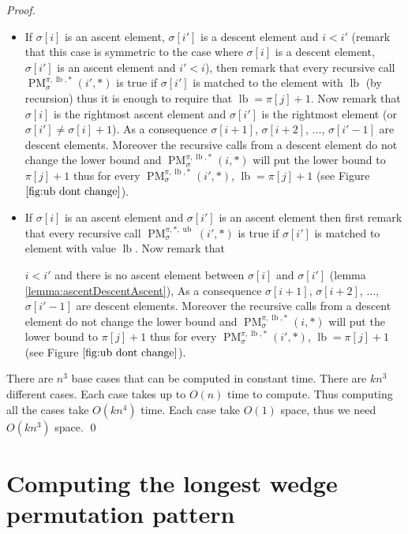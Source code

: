\documentclass[a4paper]{llncs}
\newcommand{\ptext}{\pi}
\newcommand{\ppattern}{\sigma}
\DeclareMathOperator{\PMa}{PM}
\newcommand{\PM}[6]{\PMa_{{#1}}^{{#2},{#3},{#4}}({#5},{#6})}
\DeclareMathOperator{\lb}{lb}
\DeclareMathOperator{\ub}{ub}
\begin{document}
\begin{proof}
\begin{itemize}
\begin{itemize}
			\item If $\ppattern[i]$ is an ascent element, $\ppattern[i']$ is a descent element and $i<i'$ (remark that this case is symmetric to the case where $\ppattern[i]$ is a descent element, $\ppattern[i']$ is an ascent element and $i'<i$), then
			remark that every recursive call
			$\PM{\sigma}{\ptext}{\lb}{*}{i'}{*}$ is true if $\sigma[i']$ is matched to the element with $\lb$ (by recursion) thus it is enough to require that $\lb=\ptext[j]+1$.
			Now remark that
			$\ppattern[i]$ is the rightmost ascent element and $\ppattern[i']$ is the rightmost element (or $\ppattern[i'] \neq \ppattern[i]+1$). 
			As a consequence $\sigma[i+1]$, $\sigma[i+2]$, $\ldots$, $\sigma[i'-1]$ are descent elements. Moreover the recursive calls from a descent element do not change the lower bound and $\PM{\sigma}{\ptext}{\lb}{*}{i}{*}$ will put the lower bound to $\ptext[j]+1$
			thus for every $\PM{\sigma}{\ptext}{\lb}{*}{i'}{*}$, $\lb=\ptext[j]+1$ (see Figure $\ref{fig:ub dont change}$). 	
			
			\item If $\ppattern[i]$ is an ascent element and $\ppattern[i']$ is an ascent element then
			first remark that every recursive call
			$\PM{\sigma}{\ptext}{*}{\ub}{i'}{*}$ is true if $\sigma[i']$ is matched to element with value $\lb$. 
			Now remark that

			$i<i'$ and there is no  ascent element between $\ppattern[i]$ and $\ppattern[i']$ (lemma \ref{lemma:ascentDescentAscent}), 
			As a consequence $\sigma[i+1]$, $\sigma[i+2]$, $\ldots$, $\sigma[i'-1]$ are descent elements.  Moreover the recursive calls from a descent element do not change the lower bound and $\PM{\sigma}{\ptext}{\lb}{*}{i}{*}$ will put the lower bound to $\ptext[j]+1$ thus for every $\PM{\sigma}{\ptext}{\lb}{*}{i'}{*}$, $\lb=\ptext[j]+1$ (see Figure $\ref{fig:ub dont change}$).
		\end{itemize}
\end{itemize}

There are $n^3$ base cases that can be computed in constant time.
There are $kn^3$ different cases. Each case takes up to $O(n)$ time to compute.
Thus computing all the cases take $O(kn^4)$ time.
Each case take $O(1)$ space, thus we need $O(kn^3)$ space.
\qed
\end{proof}


\section{Computing the longest wedge permutation pattern}
\label{section:LCS}
\end{document}
